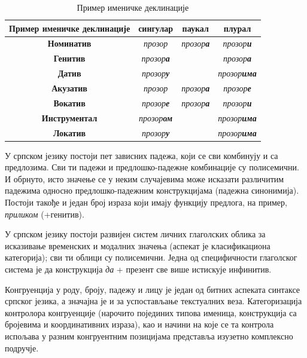 {\begin{multicols}{2}
\begin{table}[ht]
\begin{center}
\begin{tabular}{|c|c|c|c|}
\hline
{\textbf{Пример именичке деклинације}} & {\textbf{сингулар}} & {\textbf{паукал}} & {\textbf{плурал}} \\
\hline
{\textbf{Номинатив}} & \textit{прозор} & \textit{прозор\textbf{а}} & \textit{прозор\textbf{и}} \\
\hline
{\textbf{Генитив}} & \textit{прозор\textbf{а}} & & \textit{прозор\textbf{а}} \\
\hline
{\textbf{Датив}} & \textit{прозор\textbf{у}} & & \textit{прозор\textbf{има}} \\
\hline
{\textbf{Акузатив}} & \textit{прозор} & \textit{прозор\textbf{а}} & \textit{прозор\textbf{е}} \\
\hline
{\textbf{Вокатив}} & \textit{прозор\textbf{е}} & \textit{прозор\textbf{а}} & \textit{прозор\textbf{и}} \\
\hline
{\textbf{Инструментал}} & \textit{прозор\textbf{ом}} & & \textit{прозор\textbf{има}} \\
\hline
{\textbf{Локатив}} & \textit{прозор\textbf{у}} & & \textit{прозор\textbf{има}} \\
\hline
\end{tabular}
\end{center}
\caption{Пример именичке деклинације}
\label{imenicka_deklinacija}
\end{table}

У српском језику постоји пет зависних падежа, који се сви комбинују и са предлозима. Сви ти падежи и предлошко-падежне комбинације су полисемични. И обрнуто, исто значење се у неким случајевима може исказати различитим падежима односно предлошко-падежним конструкцијама (падежна синонимија). Постоји такође и један број израза који имају функцију предлога, на пример, \textit{приликом} (+генитив).

У српском језику постоји развијен систем личних глаголских облика за исказивање временских и модалних значења (аспекат је класификациона категорија); сви ти облици су полисемични. Једна од специфичности глаголског система је да конструкција \textit{да} + презент све више истискује инфинитив.

Конгруенција у роду, броју, падежу и лицу је један од битних аспеката синтаксе српског језика, а значајна је и за успостављање текстуалних веза. Категоризација контролора конгруенције (нарочито појединих типова именица, конструкција са бројевима и координативних  израза), као и начини на које се та контрола испољава у разним конгруентним позицијама представља и\-зу\-зе\-тно комплексно подручје.


\end{multicols}}
